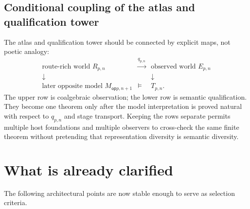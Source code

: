 \documentclass[11pt]{article}
\theoremstyle{definition}
\theoremstyle{remark}
\newcommand{\op}{\mathsf{op}}
\begin{document}
\subsection{Conditional coupling of the atlas and qualification tower}

The atlas and qualification tower should be connected by explicit maps, not
poetic analogy:
\[
\begin{array}{ccc}
\text{route-rich world }R_{p,n} & \xrightarrow{q_{p,n}} &
  \text{observed world }E_{p,n}\\
\downarrow & & \downarrow\\
\text{later opposite model }M_{\op p,n+1} & \models & T_{p,n}.
\end{array}
\]
The upper row is coalgebraic observation; the lower row is semantic
qualification.  They become one theorem only after the model interpretation is
proved natural with respect to $q_{p,n}$ and stage transport.  Keeping the rows
separate permits multiple host foundations and multiple observers to cross-check
the same finite theorem without pretending that representation diversity is
semantic diversity.

\section{What is already clarified}

The following architectural points are now stable enough to serve as selection
criteria.
\end{document}
